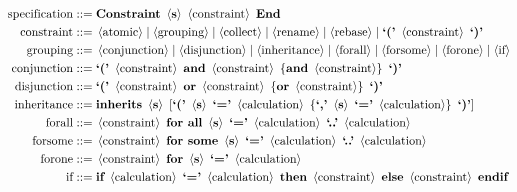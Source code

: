 \begin{minipage}{15cm}
\begin{align*}
\text{spec\text{if}ication} ::= {}&\text{\bf Constraint}\ \left<\text{\bf s}\right>\ \left<\text{constraint}\right>\ \text{\bf End}\\
\text{constraint} ::= {}&\left<\text{\text{atomic}}\right> \mid \left<\text{grouping}\right> \mid \left<\text{\text{collect}}\right> \mid \left<\text{\text{rename}}\right> \mid \left<\text{\text{rebase}}\right> \mid \text{\bf `('}\ \left<\text{constraint}\right>\ \text{\bf `)'}\\
\text{grouping} ::= {}&\left<\text{conjunction}\right> \mid \left<\text{disjunction}\right> \mid \left<\text{inheritance}\right> \mid \left<\text{forall}\right> \mid \left<\text{forsome}\right> \mid \left<\text{forone}\right> \mid \left<\text{if}\right>\\
\text{conjunction} ::= {}&\text{\bf `('}\ \left<\text{constraint}\right>\ \text{\bf and}\ \left<\text{constraint}\right>\ \left\{ \text{\bf and}\ \left<\text{constraint}\right> \right\}\ \text{\bf `)'}\\
\text{disjunction} ::= {}&\text{\bf `('}\ \left<\text{constraint}\right>\ \text{\bf or}\ \left<\text{constraint}\right>\ \left\{ \text{\bf or}\ \left<\text{constraint}\right> \right\}\ \text{\bf `)'}\\
\text{inheritance} ::= {}&\text{\bf inherits}\ \left<\text{\bf s}\right>\ [ \text{\bf `('}\ \left<\text{\bf s}\right>\ \text{\bf `='}\ \left<\text{calculation}\right>\ \left\{ \text{\bf `,'}\ \left<\text{\bf s}\right>\ \text{\bf `='}\ \left<\text{calculation}\right> \right\}\ \text{\bf `)'} ]\\
\text{forall}      ::= {}&\left<\text{constraint}\right>\ \text{\bf for all}\ \left<\text{\bf s}\right>\ \text{\bf `='}\ \left<\text{calculation}\right>\ \text{\bf `..'}\ \left<\text{calculation}\right>\\
\text{forsome}     ::= {}&\left<\text{constraint}\right>\ \text{\bf for some}\ \left<\text{\bf s}\right>\ \text{\bf `='}\ \left<\text{calculation}\right>\ \text{\bf `..'}\ \left<\text{calculation}\right>\\
\text{forone}      ::= {}&\left<\text{constraint}\right>\ \text{\bf for}\ \left<\text{\bf s}\right>\ \text{\bf `='}\ \left<\text{calculation}\right>\\
\text{if}          ::= {}&\text{\bf if}\ \left<\text{calculation}\right>\ \text{\bf `='}\ \left<\text{calculation}\right>\ \text{\bf then}\ \left<\text{constraint}\right>\ \text{\bf else}\ \left<\text{constraint}\right>\ \text{\bf endif}\\

\end{align*}
\end{minipage}
